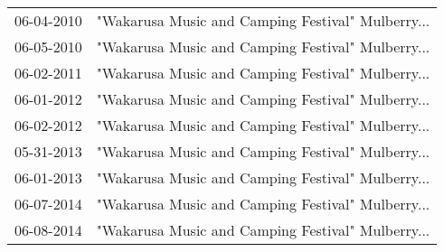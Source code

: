 \begin{supertabular}{ll}
 06-04-2010 &  "Wakarusa Music and Camping Festival" Mulberry... \\
 06-05-2010 &  "Wakarusa Music and Camping Festival" Mulberry... \\
 06-02-2011 &  "Wakarusa Music and Camping Festival" Mulberry... \\
 06-01-2012 &  "Wakarusa Music and Camping Festival" Mulberry... \\
 06-02-2012 &  "Wakarusa Music and Camping Festival" Mulberry... \\
 05-31-2013 &  "Wakarusa Music and Camping Festival" Mulberry... \\
 06-01-2013 &  "Wakarusa Music and Camping Festival" Mulberry... \\
 06-07-2014 &  "Wakarusa Music and Camping Festival" Mulberry... \\
 06-08-2014 &  "Wakarusa Music and Camping Festival" Mulberry... \\
\end{supertabular}
